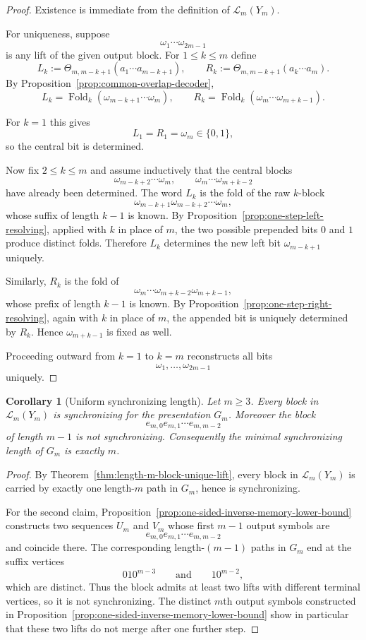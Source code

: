 \documentclass[11pt,letterpaper]{article}
\numberwithin{equation}{section}
\theoremstyle{plain}
\newtheorem{corollary}[theorem]{Corollary}
\theoremstyle{definition}
\theoremstyle{remark}
\DeclareMathOperator{\Fold}{Fold}
\begin{document}
\begin{proof}
Existence is immediate from the definition of $\mathcal L_m(Y_m)$.

For uniqueness, suppose
\[
\omega_1\cdots\omega_{2m-1}
\]
is any lift of the given output block.  For $1\le k\le m$ define
\[
L_k:=\Theta_{m,m-k+1}(a_1\cdots a_{m-k+1}),
\qquad
R_k:=\Theta_{m,m-k+1}(a_k\cdots a_m).
\]
By Proposition~\ref{prop:common-overlap-decoder},
\[
L_k=\Fold_k(\omega_{m-k+1}\cdots\omega_m),
\qquad
R_k=\Fold_k(\omega_m\cdots\omega_{m+k-1}).
\]

For $k=1$ this gives
\[
L_1=R_1=\omega_m\in\{0,1\},
\]
so the central bit is determined.

Now fix $2\le k\le m$ and assume inductively that the central blocks
\[
\omega_{m-k+2}\cdots\omega_m,
\qquad
\omega_m\cdots\omega_{m+k-2}
\]
have already been determined.  The word $L_k$ is the fold of the raw $k$-block
\[
\omega_{m-k+1}\omega_{m-k+2}\cdots\omega_m,
\]
whose suffix of length $k-1$ is known.  By
Proposition~\ref{prop:one-step-left-resolving}, applied with $k$ in place of
$m$, the two possible prepended bits $0$ and $1$ produce distinct folds.
Therefore $L_k$ determines the new left bit $\omega_{m-k+1}$ uniquely.

Similarly, $R_k$ is the fold of
\[
\omega_m\cdots\omega_{m+k-2}\omega_{m+k-1},
\]
whose prefix of length $k-1$ is known.  By
Proposition~\ref{prop:one-step-right-resolving}, again with $k$ in place of
$m$, the appended bit is uniquely determined by $R_k$.  Hence $\omega_{m+k-1}$
is fixed as well.

Proceeding outward from $k=1$ to $k=m$ reconstructs all bits
\[
\omega_1,\ldots,\omega_{2m-1}
\]
uniquely.
\end{proof}

\begin{corollary}[Uniform synchronizing length]
\label{cor:uniform-synchronizing-length}
Let $m\ge 3$.  Every block in $\mathcal L_m(Y_m)$ is synchronizing for the
presentation $G_m$.  Moreover the block
\[
e_{m,0}e_{m,1}\cdots e_{m,m-2}
\]
of length $m-1$ is not synchronizing.  Consequently the minimal synchronizing
length of $G_m$ is exactly $m$.
\end{corollary}

\begin{proof}
By Theorem~\ref{thm:length-m-block-unique-lift}, every block in
$\mathcal L_m(Y_m)$ is carried by exactly one length-$m$ path in $G_m$, hence
is synchronizing.

For the second claim, Proposition~\ref{prop:one-sided-inverse-memory-lower-bound}
constructs two sequences $U_m$ and $V_m$ whose first $m-1$ output symbols are
\[
e_{m,0}e_{m,1}\cdots e_{m,m-2}
\]
and coincide there.  The corresponding length-$(m-1)$ paths in $G_m$ end at the
suffix vertices
\[
010^{m-3}
\qquad\text{and}\qquad
10^{m-2},
\]
which are distinct.  Thus the block admits at least two lifts with different
terminal vertices, so it is not synchronizing.  The distinct $m$th output
symbols constructed in Proposition~\ref{prop:one-sided-inverse-memory-lower-bound}
show in particular that these two lifts do not merge after one further step.
\end{proof}
\end{document}
